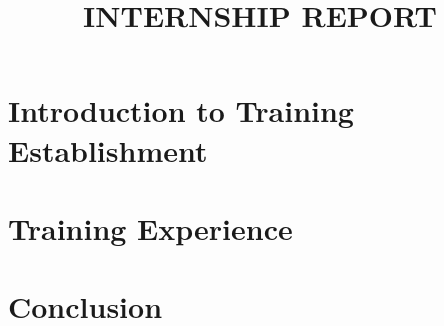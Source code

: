 \documentclass[12pt] {article}
\title{INTERNSHIP REPORT}
\begin{document}


\newpage

\tableofcontents
\newpage
\listoffigures
\listoftables
\newpage
{}


\newpage
\section{Introduction to Training Establishment}


\newpage
\section{Training Experience}


\newpage
\section{Conclusion}

\end{document}
